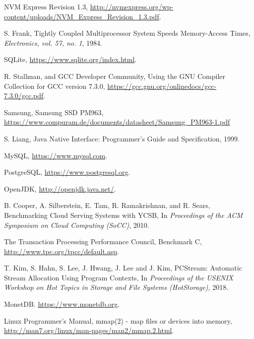 \begin{thebibliography}{00}
NVM Express Revision 1.3,
\url{http://nvmexpress.org/wp-content/uploads/NVM_Express_Revision_1.3.pdf}.

S. Frank,
Tightly Coupled Multiprocessor System Speeds Memory-Access Times,
\textit{Electronics, vol. 57, no. 1}, 1984.

SQLite,
\url{https://www.sqlite.org/index.html}.


R. Stallman, and GCC Developer Community,
Using the GNU Compiler Collection for GCC version 7.3.0,
\url{https://gcc.gnu.org/onlinedocs/gcc-7.3.0/gcc.pdf}.

Samsung, Samsung SSD PM963, 
\url{https://www.compuram.de/documents/datasheet/Samsung_PM963-1.pdf}

S. Liang,
Java Native Interface: Programmer's Guide and Specification,
1999.

MySQL,
\url{https://www.mysql.com}.

PostgreSQL,
\url{https://www.postgresql.org}.

OpenJDK,
\url{http://openjdk.java.net/}.

B. Cooper, A. Silberstein, E. Tam, R. Ramakrishnan, and R. Sears,
Benchmarking Cloud Serving Systems with YCSB,
In \textit{Proceedings of the ACM Symposium on Cloud Computing (SoCC)}, 2010.

The Transaction Processing Performance Council,
Benchmark C,
\url{http://www.tpc.org/tpcc/default.asp}. 

T. Kim, S. Hahn, S. Lee, J. Hwang, J. Lee and J. Kim,
PCStream: Automatic Stream Allocation Using Program Contexts,
In \textit{Proceedings of the USENIX Workshop on Hot Topics in Storage
and File Systems (HotStorage)}, 2018.

MonetDB.
\url{https://www.monetdb.org}.

Linux Programmer's Manual,
mmap(2) - map files or devices into memory,
\url{http://man7.org/linux/man-pages/man2/mmap.2.html}.

\end{thebibliography}
